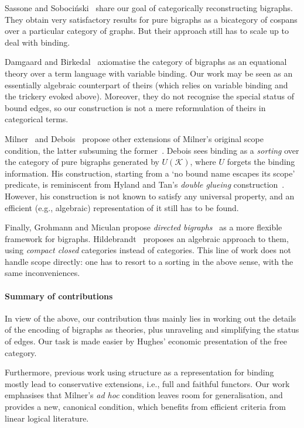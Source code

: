 \documentclass{llncs}
\newcommand{\cat}[1]{\mathbf{#1}}
\newcommand{\fonc}[1]{\mathsf{#1}}
\newcommand{\bsig}{\mathcal{K}} \newcommand{\model}{\mathcal{L}} \newcommand{\bbig}{\cat{Bbg}} \newcommand{\T}{\fonc{T}} \newcommand{\theory}{\mathcal{T}}
\begin{document}
Sassone and Soboci\'{n}ski~\cite{Sobocinski:graphslics} share our goal of
categorically reconstructing bigraphs. They obtain very satisfactory
results for pure bigraphs as a bicategory of cospans over a particular
category of graphs. But their approach still has to scale up to deal
with binding.

Damgaard and Birkedal~\cite{Birkedal} axiomatise the category of
bigraphs as an equational theory over a term language with variable
binding. Our work may be seen as an essentially algebraic counterpart
of theirs (which relies on variable binding and the trickery evoked
above).  Moreover, they do not recognise the special status of bound
edges, so our construction is not a mere reformulation of theirs in
categorical terms.

Milner~\cite{Milner:bigraphs2} and Debois~\cite{Debois:phd}
propose other extensions of Milner's original scope condition, the
latter subsuming the former~\cite[Section~6.4]{Debois:phd}.  Debois
sees binding as a \emph{sorting} over the category of pure bigraphs
generated by $U(\bsig)$, where $U$ forgets the binding information.
His construction, starting from a `no bound name escapes its scope'
predicate, is reminiscent from Hyland and Tan's \emph{double glueing}
construction~\cite{Tan:phd}. However, his construction is not known to
satisfy any universal property, and an efficient (e.g., algebraic)
representation of it still has to be found. 

Finally, Grohmann and Miculan propose \emph{directed
  bigraphs}~\cite{grohmann} as a more flexible framework for
bigraphs. Hildebrandt~\cite{Hildebrandt:choco} proposes an algebraic
approach to them, using \emph{compact closed} categories instead of
\smc{} categories. This line of work does not handle scope directly:
one has to resort to a sorting in the above sense, with the same
inconveniences.

\paragraph{Summary of contributions}
In view of the above, our contribution thus mainly lies in working out
the details of the encoding of bigraphs as \smc{} theories, plus
unraveling and simplifying the status of edges. Our task is made
easier by Hughes' economic presentation of the free \smc{} category.

Furthermore, previous work using \smc{} structure as a representation
for binding mostly lead to conservative extensions, i.e., full and
faithful functors. Our work emphasises that Milner's \emph{ad hoc}
condition leaves room for generalisation, and provides a new,
canonical condition, which benefits from efficient criteria from
linear logical literature.
\end{document}
